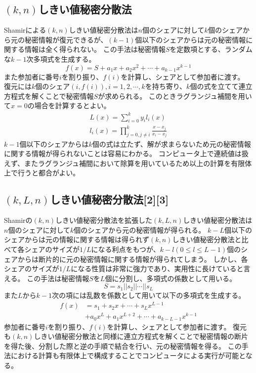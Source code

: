 \documentclass[twocolumn,a4paper]{jsarticle}
\begin{document}
	\subsection{$(k,n)$しきい値秘密分散法}
	Shamirによる$(k,n)$しきい値秘密分散法は$n$個のシェアに対して$k$個のシェアから元の秘密情報が復元できるが、$(k-1)$個以下のシェアからは元の秘密情報に関する情報は全く得られない。
	この手法は秘密情報$S$を定数項とする、ランダムな$k-1$次多項式を生成する。
	\begin{equation}
		f(x)=S+a_{1}x+a_{2}x^{2}+{\cdots}+a_{k-1}x^{k-1}
	\end{equation}
	また参加者に番号$i$を割り振り、$f(i)$を計算し、シェアとして参加者に渡す。
	復元には$k$個のシェア$(i,f(i)),i=1,2,\cdots,k$を持ち寄り、$k$個の式を立てて連立方程式を解くことで秘密情報$S$が求められる。
	このときラグランジュ補間を用いて$x=0$の場合を計算するとよい。
	\begin{align}
		L(x)={\sum_{i=0}^{k}{y_{i}l_{i}(x)}} \\
		l_{i}(x)={\prod_{j=0,j{\neq}i}^{k}{\frac{x-x_{j}}{x_{i}-x_{j}}}}
	\end{align}
	$k-1$個以下のシェアからは$k$個の式は立たず、解が求まらないため元の秘密情報に関する情報が得られないことは容易にわかる。
	コンピュータ上で連続値は扱えず、またラグランジュ補間において除算を用いているため以上の計算を有限体上で行うと都合がよい。

	\subsection{$(k,L,n)$しきい値秘密分散法[2][3]}
	Shamirの$(k,n)$しきい値秘密分散法を拡張した$(k,L,n)しきい値秘密分散法$は$n$個のシェアに対して$k$個のシェアから元の秘密情報が得られる。
	$k-L$個以下のシェアからは元の情報に関する情報は得られず$(k,n)$しきい値秘密分散法と比べて各シェアのサイズが$1/L$になる利点をもつが、$k-l(0{\leq}l{\leq}L-1)$個のシェアからは断片的に元の秘密情報に関する情報が得られてしまう。
	しかし、各シェアのサイズが$1/L$になる性質は非常に強力であり、実用性に長けていると言える。
	この手法は秘密情報$S$を$L$個に分割し、多項式の係数として用いる。
	\begin{equation}
		S=s_{1}||s_{2}||{\cdots}||s_{L}
	\end{equation}
	また$L$から$k-1$次の項には乱数を係数として用いて以下の多項式を生成する。
	\begin{equation}
		\begin{split}
			f(x)&=s_{1}+s_{2}x+{\cdots}+s_{L}x^{L-1} \\
			&+a_{0}x^{L}+a_{1}x^{L+2}+{\cdots}+a_{k-L-1}x^{k-1}
		\end{split}
	\end{equation}
	参加者に番号$i$を割り振り、$f(i)$を計算し、シェアとして参加者に渡す。
	復元も$(k,n)$しきい値秘密分散法と同様に連立方程式を解くことで秘密情報の断片を得た後、分割した際と逆の手順で結合を行い、元の秘密情報を得る。
	この手法における計算も有限体上で構成することでコンピュータによる実行が可能となる。
\end{document}
